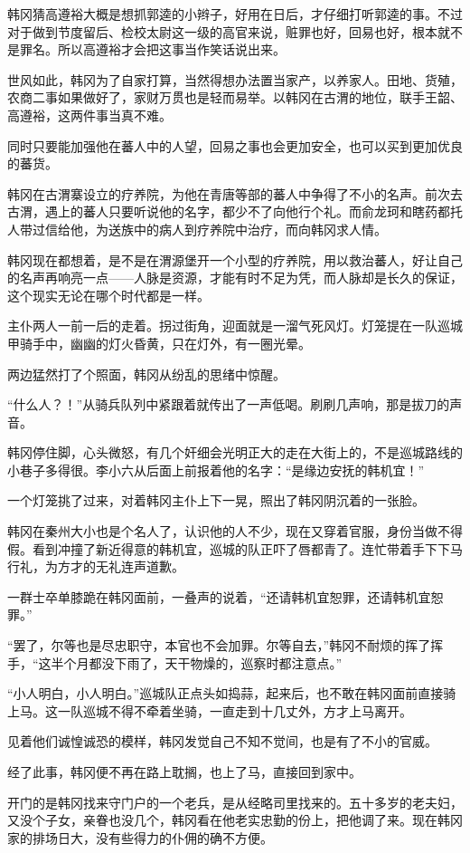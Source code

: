 韩冈猜高遵裕大概是想抓郭逵的小辫子，好用在日后，才仔细打听郭逵的事。不过对于做到节度留后、检校太尉这一级的高官来说，赃罪也好，回易也好，根本就不是罪名。所以高遵裕才会把这事当作笑话说出来。

世风如此，韩冈为了自家打算，当然得想办法置当家产，以养家人。田地、货殖，农商二事如果做好了，家财万贯也是轻而易举。以韩冈在古渭的地位，联手王韶、高遵裕，这两件事当真不难。

同时只要能加强他在蕃人中的人望，回易之事也会更加安全，也可以买到更加优良的蕃货。

韩冈在古渭寨设立的疗养院，为他在青唐等部的蕃人中争得了不小的名声。前次去古渭，遇上的蕃人只要听说他的名字，都少不了向他行个礼。而俞龙珂和瞎药都托人带过信给他，为送族中的病人到疗养院中治疗，而向韩冈求人情。

韩冈现在都想着，是不是在渭源堡开一个小型的疗养院，用以救治蕃人，好让自己的名声再响亮一点——人脉是资源，才能有时不足为凭，而人脉却是长久的保证，这个现实无论在哪个时代都是一样。

主仆两人一前一后的走着。拐过街角，迎面就是一溜气死风灯。灯笼提在一队巡城甲骑手中，幽幽的灯火昏黄，只在灯外，有一圈光晕。

两边猛然打了个照面，韩冈从纷乱的思绪中惊醒。

“什么人？！”从骑兵队列中紧跟着就传出了一声低喝。刷刷几声响，那是拔刀的声音。

韩冈停住脚，心头微怒，有几个奸细会光明正大的走在大街上的，不是巡城路线的小巷子多得很。李小六从后面上前报着他的名字：“是缘边安抚的韩机宜！”

一个灯笼挑了过来，对着韩冈主仆上下一晃，照出了韩冈阴沉着的一张脸。

韩冈在秦州大小也是个名人了，认识他的人不少，现在又穿着官服，身份当做不得假。看到冲撞了新近得意的韩机宜，巡城的队正吓了唇都青了。连忙带着手下下马行礼，为方才的无礼连声道歉。

一群士卒单膝跪在韩冈面前，一叠声的说着，“还请韩机宜恕罪，还请韩机宜恕罪。”

“罢了，尔等也是尽忠职守，本官也不会加罪。尔等自去，”韩冈不耐烦的挥了挥手，“这半个月都没下雨了，天干物燥的，巡察时都注意点。”

“小人明白，小人明白。”巡城队正点头如捣蒜，起来后，也不敢在韩冈面前直接骑上马。这一队巡城不得不牵着坐骑，一直走到十几丈外，方才上马离开。

见着他们诚惶诚恐的模样，韩冈发觉自己不知不觉间，也是有了不小的官威。

经了此事，韩冈便不再在路上耽搁，也上了马，直接回到家中。

开门的是韩冈找来守门户的一个老兵，是从经略司里找来的。五十多岁的老夫妇，又没个子女，亲眷也没几个，韩冈看在他老实忠勤的份上，把他调了来。现在韩冈家的排场日大，没有些得力的仆佣的确不方便。

